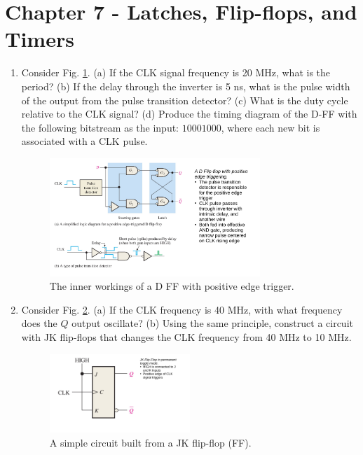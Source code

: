 \documentclass[10pt]{article}
\begin{document}
\clearpage

\section{Chapter 7 - Latches, Flip-flops, and Timers}
\label{sec:latch}
\begin{enumerate}
\item Consider Fig. \ref{fig:detect}.  (a) If the CLK signal frequency is 20 MHz, what is the period? (b) If the delay through the inverter is 5 ns, what is the pulse width of the output from the pulse transition detector? (c) What is the duty cycle relative to the CLK signal? (d) Produce the timing diagram of the D-FF with the following bitstream as the input: $10001000$, where each new bit is associated with a CLK pulse.
\begin{figure}[ht]
\centering
\includegraphics[width=0.75\textwidth]{figures/detect.pdf}
\caption{\label{fig:detect} The inner workings of a D FF with positive edge trigger.}
\end{figure}
\item Consider Fig. \ref{fig:detect2}. (a) If the CLK frequency is 40 MHz, with what frequency does the $Q$ output oscillate? (b) Using the same principle, construct a circuit with JK flip-flops that changes the CLK frequency from 40 MHz to 10 MHz.
\begin{figure}[hb]
\centering
\includegraphics[width=0.5\textwidth]{figures/detect2.pdf}
\caption{\label{fig:detect2} A simple circuit built from a JK flip-flop (FF).}
\end{figure}
\end{enumerate}
\end{document}

